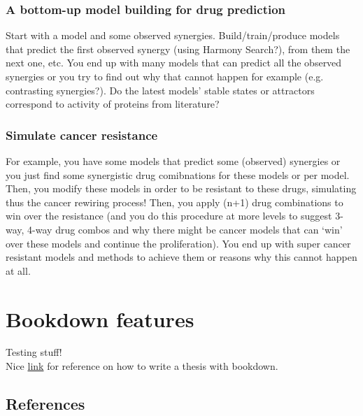 \documentclass[12pt,]{book}
\theoremstyle{definition}
\theoremstyle{definition}
\theoremstyle{definition}
\theoremstyle{remark}
\begin{document}
\hypertarget{a-bottom-up-model-building-for-drug-prediction}{%
\subsection{A bottom-up model building for drug prediction}\label{a-bottom-up-model-building-for-drug-prediction}}

Start with a model and some observed synergies. Build/train/produce models that
predict the first observed synergy (using Harmony Search?), from them the next
one, etc. You end up with many models that can predict all the observed
synergies or you try to find out why that cannot happen for example (e.g.~
contrasting synergies?). Do the latest models' stable states or attractors
correspond to activity of proteins from literature?

\hypertarget{simulate-cancer-resistance}{%
\subsection{Simulate cancer resistance}\label{simulate-cancer-resistance}}

For example, you have some models that predict some (observed) synergies or you
just find some synergistic drug comibnations for these models or per model.
Then, you modify these models in order to be resistant to these drugs, simulating
thus the cancer rewiring process! Then, you apply (n+1) drug combinations to
win over the resistance (and you do this procedure at more levels to suggest
3-way, 4-way drug combos and why there might be cancer models that can `win'
over these models and continue the proliferation). You end up with super cancer
resistant models and methods to achieve them or reasons why this cannot happen
at all.

\hypertarget{appendix-appendix}{%
\appendix}


\hypertarget{bookdown-features}{%
\chapter{Bookdown features}\label{bookdown-features}}

Testing stuff!\\
Nice \href{https://eddjberry.netlify.com/post/writing-your-thesis-with-bookdown/}{link}
for reference on how to write a thesis with bookdown.

\hypertarget{references}{%
\section{References}\label{references}}
\end{document}
